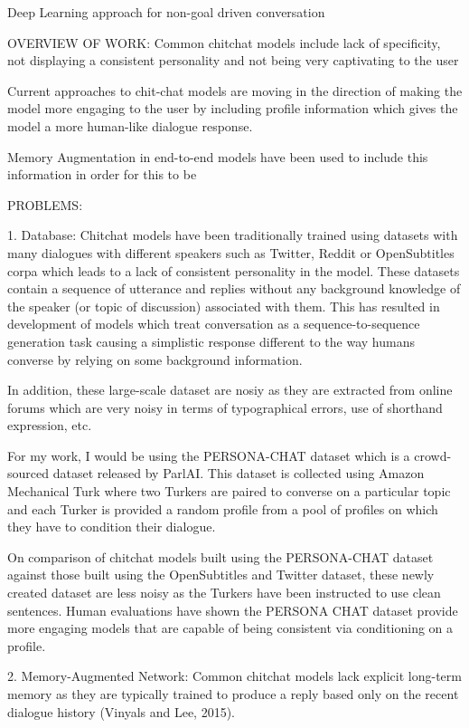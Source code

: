 Deep Learning approach for non-goal driven conversation

OVERVIEW OF WORK:
Common chitchat models include lack of specificity, not displaying a consistent personality and not being very captivating to the user

Current approaches to chit-chat models are moving in the direction of making the model more engaging to the user by including profile information which gives the model a more human-like dialogue response.

Memory Augmentation in end-to-end models have been used to include this information in order for this to be 


PROBLEMS:

1. Database:
Chitchat models have been traditionally trained using datasets with many dialogues with different speakers such as Twitter, Reddit or OpenSubtitles corpa which leads to a lack of consistent personality in the model. These datasets contain a sequence of utterance and replies without any background knowledge of the speaker (or topic of discussion) associated with them.
This has resulted in development of models which treat conversation as a sequence-to-sequence generation task causing a simplistic response different to the way humans converse by relying on some background information.

In addition, these large-scale dataset are nosiy as they are extracted from online forums which are very noisy in terms of typographical errors, use of shorthand expression, etc.

For my work, I would be using the PERSONA-CHAT dataset which is a crowd-sourced dataset released by ParlAI. This dataset is collected using Amazon Mechanical Turk  where two Turkers are paired to converse on a particular topic and each Turker is provided a random profile from a pool of profiles on which they have to condition their dialogue.

On comparison of chitchat models built using the PERSONA-CHAT dataset against those built using the OpenSubtitles and Twitter dataset, these newly created dataset are less noisy as the Turkers have been instructed to use clean sentences. Human evaluations have shown the PERSONA CHAT dataset provide more engaging models that are capable of being consistent via conditioning on a profile.


2. Memory-Augmented Network:
Common chitchat models lack explicit long-term memory as they are typically trained to produce a reply based only on the recent dialogue history (Vinyals and Lee, 2015). 


